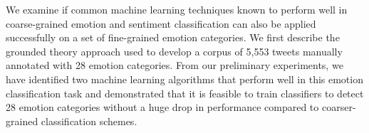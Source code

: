 We examine if common machine learning techniques known to perform well in coarse-grained emotion and sentiment classification can also be applied successfully on a set of fine-grained emotion categories. We first describe the grounded theory approach used to develop a corpus of 5,553 tweets manually annotated with 28 emotion categories. From our preliminary experiments, we have identified two machine learning algorithms that perform well in this emotion classification task and demonstrated that it is feasible to train classifiers to detect 28 emotion categories without a huge drop in performance compared to coarser-grained classification schemes.
